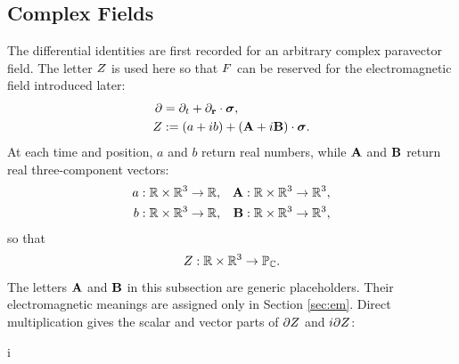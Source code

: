 \subsection{Complex Fields}\label{subsec:differential-complex-fields}
The differential identities are first recorded for an arbitrary complex
paravector field. The letter \(Z\) is used here so that \(F\) can
be reserved for the electromagnetic field introduced later:
\begin{align*}
\partial &= \partial_t+\partial_{\mathbf{r}}\cdot\mathbf{\bm{\sigma}},\\
Z &:= (a+ib)+(\mathbf{A}+i\mathbf{B})\cdot\mathbf{\bm{\sigma}}.
\end{align*}
At each time and position, \(a\) and \(b\) return real numbers, while
\(\mathbf{A}\) and \(\mathbf{B}\) return real three-component vectors:
\begin{align*}
a &: \mathbb{R}\times\mathbb{R}^3\to\mathbb{R}, &
\mathbf{A} &: \mathbb{R}\times\mathbb{R}^3\to\mathbb{R}^3,\\
b &: \mathbb{R}\times\mathbb{R}^3\to\mathbb{R}, &
\mathbf{B} &: \mathbb{R}\times\mathbb{R}^3\to\mathbb{R}^3,
\end{align*}
so that
\begin{equation*}
Z:\mathbb{R}\times\mathbb{R}^3\to\mathbb{P}_{\mathbb{C}}.
\end{equation*}
The letters \(\mathbf{A}\) and \(\mathbf{B}\) in this subsection are generic
placeholders. Their electromagnetic meanings are assigned only in Section
\ref{sec:em}.
Direct multiplication gives the scalar and vector parts of
\(\partial Z\) and \(i\partial Z\):
\begin{componenttable}{\pv{\partial} }
\end{componenttable}

\begin{componenttable}{i\,\pv{\partial} }
\end{componenttable}
